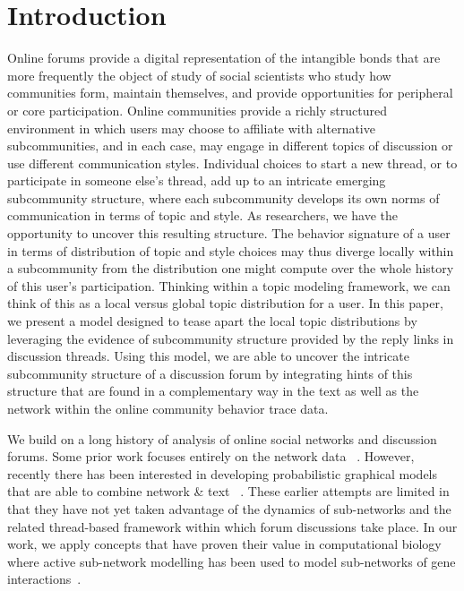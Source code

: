 \documentclass{sig-alternate}
\begin{document}
\section{Introduction}
Online forums provide a digital representation of the intangible bonds that are more frequently the object of study of social scientists who study how communities form, maintain themselves, and provide opportunities for peripheral or core participation.
Online communities provide a richly structured environment in which users may choose to affiliate with alternative subcommunities, and in each case, may engage in different topics of discussion or use different communication styles.  Individual choices to start a new thread, or to participate in someone else's thread, add up to an intricate emerging subcommunity structure, where each subcommunity develops its own norms of communication in terms of topic and style.  As researchers, we have the opportunity to uncover this resulting structure.  The behavior signature of a user in terms of distribution of topic and style choices may thus diverge locally within a subcommunity from the distribution one might compute over the whole history of this user's participation.  Thinking within a topic modeling framework, we can think of this as a local versus global topic distribution for a user.  In this paper, we present a model designed to tease apart the local topic distributions by leveraging the evidence of subcommunity structure provided by the reply links in discussion threads.  Using this model, we are able to uncover the intricate subcommunity structure of a discussion forum by integrating hints of this structure that are found in a complementary way in the text as well as the network within the online community behavior trace data.

We build on a long history of analysis of online social networks and discussion forums.  Some prior work focuses entirely on the network data ~\cite{Shi:2000:NCI:351581.351611,
Shi00learningsegmentation}.  However, recently there has been interested in developing probabilistic 
graphical models~\cite{ Airoldi:2008:MMS:1390681.1442798} that are able to combine network \& text 
~\cite{Ho:2012:DHT:2187836.2187936,Nallapati:2008:JLT:1401890.1401957}. These earlier attempts are limited in that they have not yet taken advantage of the dynamics of sub-networks and the related thread-based framework
within which forum discussions take place. In our work, we apply concepts that have proven their value in computational biology where active sub-network modelling has been used to model sub-networks
of gene interactions~\cite{journals/ploscb/DeshpandeSVHM10,Lichtenstein:Charleston}. 
\end{document}
